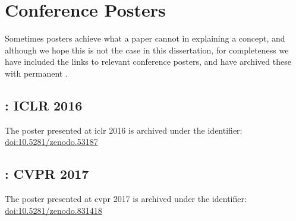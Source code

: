 \documentclass[thesis]{subfiles}
\begin{document}

\chapter{Conference Posters}
\label{posters}
Sometimes posters achieve what a paper cannot in explaining a concept, and although we hope this is not the case in this dissertation, for completeness we have included the links to relevant conference posters, and have archived these with permanent .
\section*{: ICLR 2016}
The poster presented at \gls{iclr} 2016 is archived under the identifier: \href{https://doi.org/10.5281/zenodo.53187}{doi:10.5281/zenodo.53187}
\section*{: CVPR 2017}
The poster presented at \gls{cvpr} 2017 is archived under the identifier: \href{https://doi.org/10.5281/zenodo.831418}{doi:10.5281/zenodo.831418}
\end{document}
